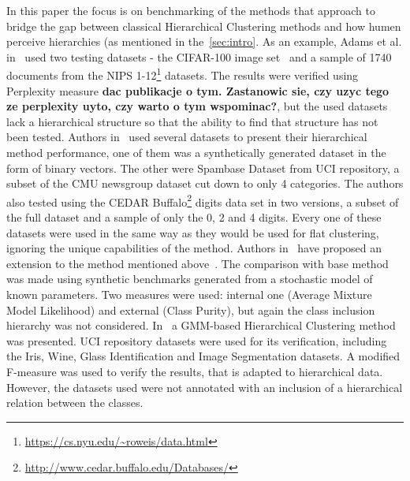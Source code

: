 \documentclass{article}
\begin{document}
In this paper the focus is on benchmarking of the methods that approach to bridge the gap between classical Hierarchical Clustering methods and how humen perceive hierarchies (as mentioned in the~\cref{sec:intro}. As an example, Adams et al. in~\cite{ghahramani2010tree} used two testing datasets - the CIFAR-100 image set~\cite{krizhevsky2009learning}  and a sample of 1740 documents from the NIPS 1-12\footnote{\url{https://cs.nyu.edu/~roweis/data.html}} datasets. The results were verified using Perplexity measure \textbf{dac publikacje o tym. Zastanowic sie, czy uzyc tego ze perplexity uyto, czy warto o tym wspominac?}, but the used datasets lack a hierarchical structure so that the ability to find that structure has not been tested. Authors in~\cite{2010_bayesian_rose_trees} used several datasets to present their hierarchical method performance, one of them was a synthetically generated dataset in the form of binary vectors. The other were Spambase Dataset from UCI repository, a subset of the CMU newsgroup dataset cut down to only 4 categories. The authors also tested using the CEDAR Buffalo\footnote{\url{http://www.cedar.buffalo.edu/Databases/}} digits data set in two versions, a subset of the full dataset and a sample of only the 0, 2 and 4 digits. Every one of these datasets were used in the same way as they would be used for flat clustering, ignoring the unique capabilities of the method. Authors in~\cite{Spytkowski2012} have proposed an extension to the method mentioned above~\cite{ghahramani2010tree}. The comparison with base method was made using synthetic benchmarks generated from a stochastic model of known parameters. Two measures were used: internal one (Average Mixture Model Likelihood) and external (Class Purity), but again the class inclusion hierarchy was not considered. In~\cite{Olech2016} a GMM-based Hierarchical Clustering method was presented. UCI repository datasets were used for its verification, including the Iris, Wine, Glass Identification and Image Segmentation datasets. A modified F-measure was used to verify the results, that is adapted to hierarchical data. However, the datasets used were not annotated with an inclusion of a hierarchical relation between the classes.
\end{document}
